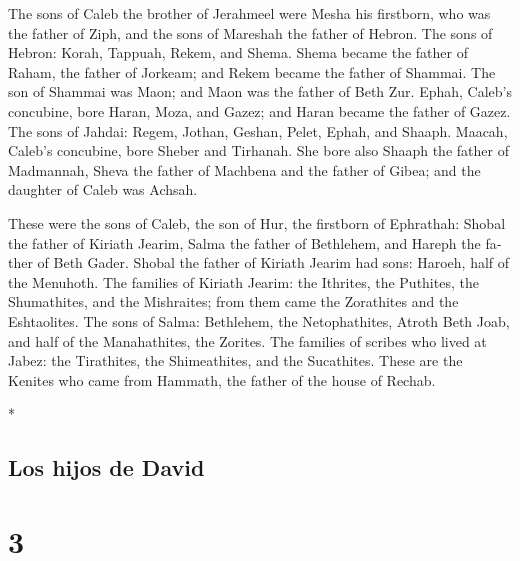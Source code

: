 \begin{paracol}{2}
\begin{otherlanguage}{english}
 The sons of Caleb the brother of Jerahmeel were Mesha
his firstborn, who was the father of Ziph, and the sons of Mareshah the
father of Hebron.  The sons of Hebron: Korah, Tappuah,
Rekem, and Shema.  Shema became the father of Raham, the
father of Jorkeam; and Rekem became the father of Shammai.
 The son of Shammai was Maon; and Maon was the father of
Beth Zur.  Ephah, Caleb's concubine, bore Haran, Moza,
and Gazez; and Haran became the father of Gazez.  The
sons of Jahdai: Regem, Jothan, Geshan, Pelet, Ephah, and Shaaph.
 Maacah, Caleb's concubine, bore Sheber and Tirhanah.
 She bore also Shaaph the father of Madmannah, Sheva the
father of Machbena and the father of Gibea; and the daughter of Caleb
was Achsah.

 These were the sons of Caleb, the son of Hur, the
firstborn of Ephrathah: Shobal the father of Kiriath Jearim,
 Salma the father of Bethlehem, and Hareph the father of
Beth Gader.  Shobal the father of Kiriath Jearim had
sons: Haroeh, half of the Menuhoth.  The families of
Kiriath Jearim: the Ithrites, the Puthites, the Shumathites, and the
Mishraites; from them came the Zorathites and the Eshtaolites.
 The sons of Salma: Bethlehem, the Netophathites, Atroth
Beth Joab, and half of the Manahathites, the Zorites. 
The families of scribes who lived at Jabez: the Tirathites, the
Shimeathites, and the Sucathites. These are the Kenites who came from
Hammath, the father of the house of Rechab.

\end{otherlanguage}

\switchcolumn[0]*

\hypertarget{los-hijos-de-david}{%
\subsection{Los hijos de David}\label{los-hijos-de-david}}

\hypertarget{section-4}{%
\section{3}\label{section-4}}


\end{paracol}
